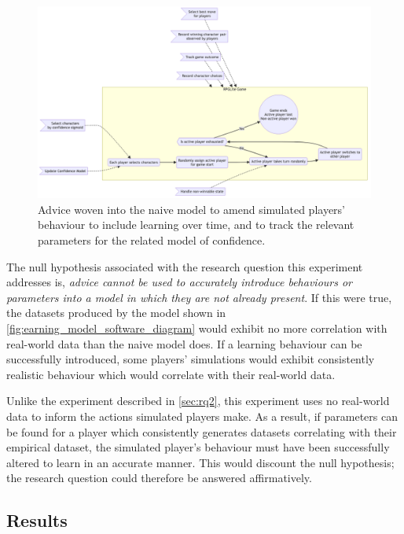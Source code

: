\begin{figure}[h]
  \centering
  \includegraphics[width=\columnwidth]{70_generality_of_aspects/diagrams/exp3_learning_model.png}
  \caption{Advice woven into the naive model to amend simulated players' behaviour to include learning over time, and to track the relevant parameters for the related model of confidence.}
  \label{fig:learning_model_software_diagram}
\end{figure}

The null hypothesis associated with the research question this experiment
addresses is, \emph{advice cannot be used to accurately introduce behaviours or
parameters into a model in which they are not already present}. If this were
true, the datasets produced by the \aspectoriented model shown in
\cref{fig:earning_model_software_diagram} would exhibit no more correlation with
real-world data than the naive model does. If a learning behaviour can be
successfully introduced, some players' simulations would exhibit consistently
realistic behaviour which would correlate with their real-world data.

Unlike the experiment described in \cref{sec:rq2}, this experiment uses no
real-world data to inform the actions simulated players make. As a result, if
parameters can be found for a player which consistently generates datasets
correlating with their empirical dataset, the simulated player's behaviour must
have been successfully altered to learn in an accurate manner. This would
discount the null hypothesis; the research question could therefore be answered
affirmatively.




\subsection{Results}

